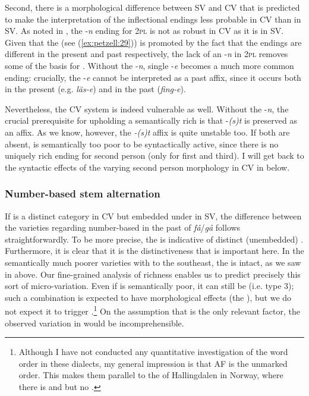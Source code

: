 \documentclass[output=paper,colorlinks,citecolor=brown,draft,draftmode]{langscibook}
\begin{document}
Second, there is a morphological difference between SV and CV that is predicted to make the  interpretation of the inflectional endings less probable in CV than in SV. As noted in , the -\textit{n} ending for 2\textsc{pl} is not as robust in CV as it is in SV. Given that the   (see (\ref{ex:petzell:29})) is promoted by the fact that the endings are different in the present and past  respectively, the lack of an -\textit{n} in 2\textsc{pl} removes some of the basis for . Without the -\textit{n}, single -\textit{e} becomes a much more common ending: crucially, the -\textit{e} cannot be interpreted as a past  affix, since it occurs both in the present (e.g. \textit{läs-e}) and in the past  (\textit{fing-e}).



Nevertheless, the CV system is indeed vulnerable as well. Without the -\textit{n}, the crucial prerequisite for upholding a semantically rich  is that -\textit{(s)t} is preserved as an affix. As we know, however, the \textit{-(s)t} affix is quite unstable too. If both are absent,  is semantically too poor to be syntactically active, since there is no uniquely rich ending for second person (only for first and third). I will get back to the syntactic effects of the varying second person morphology in CV in  below.


\subsubsection{Number-based stem alternation}\label{sec:petzell:4.3.4}


If  is a distinct category in CV but embedded under  in SV, the difference between the varieties regarding number-based  in the past  of \textit{få}/\textit{gå} follows straightforwardly. To be more precise, the  is indicative of distinct (unembedded) . Furthermore, it is clear that it is the distinctiveness that is important here. In the semantically much poorer varieties with   to the southeast, the  is intact, as we saw in  above. Our fine-grained analysis of richness enables us to predict precisely this sort of micro-variation. Even if  is semantically poor, it can still be  (i.e. type 3); such a combination is expected to have morphological effects (the ), but we do not expect it to trigger .\footnote{Although I have not conducted any quantitative investigation of the  word order in these dialects, my general impression is that AF is the unmarked order. This makes them parallel to the  of Hallingdalen in Norway, where there is  and  but no  \citep{Trosterud1989}.}  On the assumption that  is the only relevant factor, the observed variation in  would be incomprehensible.
\end{document}
